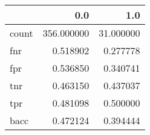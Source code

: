 \begin{tabular}{lrr}
\toprule
{} &         0.0 &        1.0 \\
\midrule
count &  356.000000 &  31.000000 \\
fnr   &    0.518902 &   0.277778 \\
fpr   &    0.536850 &   0.340741 \\
tnr   &    0.463150 &   0.437037 \\
tpr   &    0.481098 &   0.500000 \\
bacc  &    0.472124 &   0.394444 \\
\bottomrule
\end{tabular}
